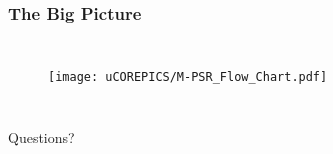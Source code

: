 \documentclass{beamer}
\begin{document}

\begin{frame}
\frametitle{The Big Picture}

\begin{columns}[c]

\begin{figure}

\texttt{[image: uCOREPICS/M-PSR\_Flow\_Chart.pdf]}
\end{figure}
\end{columns}

\end{frame}


\begin{frame}
\Huge{\centerline{Questions?}}
\end{frame}








\end{document}
